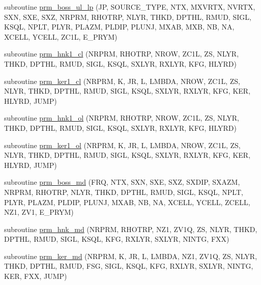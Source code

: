 \begin{DoxyCompactItemize}
\item 
subroutine \hyperlink{Leroi__c_8f90_a8fe568053ec398fc50ab206827a43d81}{prm\+\_\+boss\+\_\+ul\+\_\+lp} (JP, S\+O\+U\+R\+C\+E\+\_\+\+T\+Y\+PE, N\+TX, M\+X\+V\+R\+TX, N\+V\+R\+TX, S\+XN, S\+XE, S\+XZ, N\+R\+P\+RM, R\+H\+O\+T\+RP, N\+L\+YR, T\+H\+KD, D\+P\+T\+HL, R\+M\+UD, S\+I\+GL, K\+S\+QL, N\+P\+LT, P\+L\+YR, P\+L\+A\+ZM, P\+L\+D\+IP, P\+L\+U\+NJ, M\+X\+AB, M\+XB, NB, NA, X\+C\+E\+LL, Y\+C\+E\+LL, Z\+C1L, E\+\_\+\+P\+R\+YM)
\item 
subroutine \hyperlink{Leroi__c_8f90_a5285d5a2942c499f6219805b1e689588}{prm\+\_\+hnk1\+\_\+cl} (N\+R\+P\+RM, R\+H\+O\+T\+RP, N\+R\+OW, Z\+C1L, ZS, N\+L\+YR, T\+H\+KD, D\+P\+T\+HL, R\+M\+UD, S\+I\+GL, K\+S\+QL, S\+X\+L\+YR, R\+X\+L\+YR, K\+FG, H\+L\+Y\+RD)
\item 
subroutine \hyperlink{Leroi__c_8f90_a2ff2214d55840301662aae090b26e04d}{prm\+\_\+ker1\+\_\+cl} (N\+R\+P\+RM, K, JR, L, L\+M\+B\+DA, N\+R\+OW, Z\+C1L, ZS, N\+L\+YR, T\+H\+KD, D\+P\+T\+HL, R\+M\+UD, S\+I\+GL, K\+S\+QL, S\+X\+L\+YR, R\+X\+L\+YR, K\+FG, K\+ER, H\+L\+Y\+RD, J\+U\+MP)
\item 
subroutine \hyperlink{Leroi__c_8f90_addd341d907a00b743326c01025f01020}{prm\+\_\+hnk1\+\_\+ol} (N\+R\+P\+RM, R\+H\+O\+T\+RP, N\+R\+OW, Z\+C1L, ZS, N\+L\+YR, T\+H\+KD, D\+P\+T\+HL, R\+M\+UD, S\+I\+GL, K\+S\+QL, S\+X\+L\+YR, R\+X\+L\+YR, K\+FG, H\+L\+Y\+RD)
\item 
subroutine \hyperlink{Leroi__c_8f90_a98390b637677e60abaa0fa6df3249f0b}{prm\+\_\+ker1\+\_\+ol} (N\+R\+P\+RM, K, JR, L, L\+M\+B\+DA, N\+R\+OW, Z\+C1L, ZS, N\+L\+YR, T\+H\+KD, D\+P\+T\+HL, R\+M\+UD, S\+I\+GL, K\+S\+QL, S\+X\+L\+YR, R\+X\+L\+YR, K\+FG, K\+ER, H\+L\+Y\+RD, J\+U\+MP)
\item 
subroutine \hyperlink{Leroi__c_8f90_ac15aa4c46264754ea7abffbe2ea1926c}{prm\+\_\+boss\+\_\+md} (F\+RQ, N\+TX, S\+XN, S\+XE, S\+XZ, S\+X\+D\+IP, S\+X\+A\+ZM, N\+R\+P\+RM, R\+H\+O\+T\+RP, N\+L\+YR, T\+H\+KD, D\+P\+T\+HL, R\+M\+UD, S\+I\+GL, K\+S\+QL, N\+P\+LT, P\+L\+YR, P\+L\+A\+ZM, P\+L\+D\+IP, P\+L\+U\+NJ, M\+X\+AB, NB, NA, X\+C\+E\+LL, Y\+C\+E\+LL, Z\+C\+E\+LL, N\+Z1, Z\+V1, E\+\_\+\+P\+R\+YM)
\item 
subroutine \hyperlink{Leroi__c_8f90_a9740ab7613ac873fc595cc92e6d5fbaf}{prm\+\_\+hnk\+\_\+md} (N\+R\+P\+RM, R\+H\+O\+T\+RP, N\+Z1, Z\+V1Q, ZS, N\+L\+YR, T\+H\+KD, D\+P\+T\+HL, R\+M\+UD, S\+I\+GL, K\+S\+QL, K\+FG, R\+X\+L\+YR, S\+X\+L\+YR, N\+I\+N\+TG, F\+XX)
\item 
subroutine \hyperlink{Leroi__c_8f90_a54994b19439ad9ea5bfc96a902101c44}{prm\+\_\+ker\+\_\+md} (N\+R\+P\+RM, K, JR, L, L\+M\+B\+DA, N\+Z1, Z\+V1Q, ZS, N\+L\+YR, T\+H\+KD, D\+P\+T\+HL, R\+M\+UD, F\+SG, S\+I\+GL, K\+S\+QL, K\+FG, R\+X\+L\+YR, S\+X\+L\+YR, N\+I\+N\+TG, K\+ER, F\+XX, J\+U\+MP)

\end{DoxyCompactItemize}

